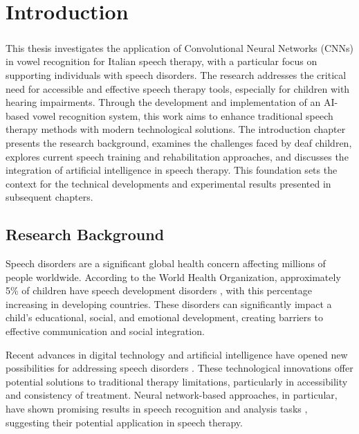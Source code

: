 
\chapter{Introduction}
\label{chp:intro}

\paragraph{}
This thesis investigates the application of Convolutional Neural Networks (CNNs) in vowel recognition for Italian speech therapy, with a particular focus on supporting individuals with speech disorders. The research addresses the critical need for accessible and effective speech therapy tools, especially for children with hearing impairments. Through the development and implementation of an AI-based vowel recognition system, this work aims to enhance traditional speech therapy methods with modern technological solutions. The introduction chapter presents the research background, examines the challenges faced by deaf children, explores current speech training and rehabilitation approaches, and discusses the integration of artificial intelligence in speech therapy. This foundation sets the context for the technical developments and experimental results presented in subsequent chapters.


\section{Research Background}
\label{sec:background}

Speech disorders are a significant global health concern affecting millions of people worldwide. According to the World Health Organization, approximately 5\% of children have speech development disorders \cite{who2021}, with this percentage increasing in developing countries. These disorders can significantly impact a child's educational, social, and emotional development, creating barriers to effective communication and social integration.

Recent advances in digital technology and artificial intelligence have opened new possibilities for addressing speech disorders \cite{speech_therapy2023}. These technological innovations offer potential solutions to traditional therapy limitations, particularly in accessibility and consistency of treatment. Neural network-based approaches, in particular, have shown promising results in speech recognition and analysis tasks \cite{neural_speech2022}, suggesting their potential application in speech therapy.

